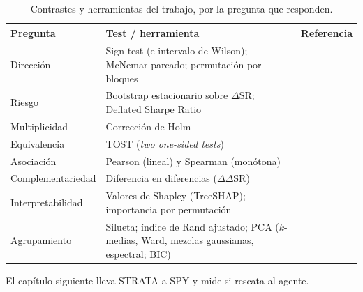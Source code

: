 \begin{table}[htbp]
\centering
\caption{Contrastes y herramientas del trabajo, por la pregunta que responden.}
\label{tab:tests}
\small
\begin{tabular}{p{} p{} l}
\toprule
\textbf{Pregunta} & \textbf{Test / herramienta} & \textbf{Referencia} \\
\midrule
Dirección & Sign test (e intervalo de Wilson); McNemar pareado; permutación por bloques & \cite{conover1999, mcnemar1947} \\
Riesgo & Bootstrap estacionario sobre $\Delta\mathrm{SR}$; Deflated Sharpe Ratio & \cite{politis1994, bailey2014} \\
Multiplicidad & Corrección de Holm & \cite{holm1979} \\
Equivalencia & TOST (\emph{two one-sided tests}) & \cite{schuirmann1987} \\
Asociación & Pearson (lineal) y Spearman (monótona) & \\
Complementariedad & Diferencia en diferencias ($\Delta\Delta\mathrm{SR}$) & \\
Interpretabilidad & Valores de Shapley (TreeSHAP); importancia por permutación & \cite{lundberg2017, lundberg2020, breiman2001} \\
Agrupamiento & Silueta; índice de Rand ajustado; PCA ($k$-medias, Ward, mezclas gaussianas, espectral; BIC) & \cite{macqueen1967, ward1963, dempster1977, ng2002spectral, schwarz1978, hubert1985, jolliffe2002} \\
\bottomrule
\end{tabular}
\end{table}

El capítulo siguiente lleva STRATA a SPY y mide si rescata al agente.
